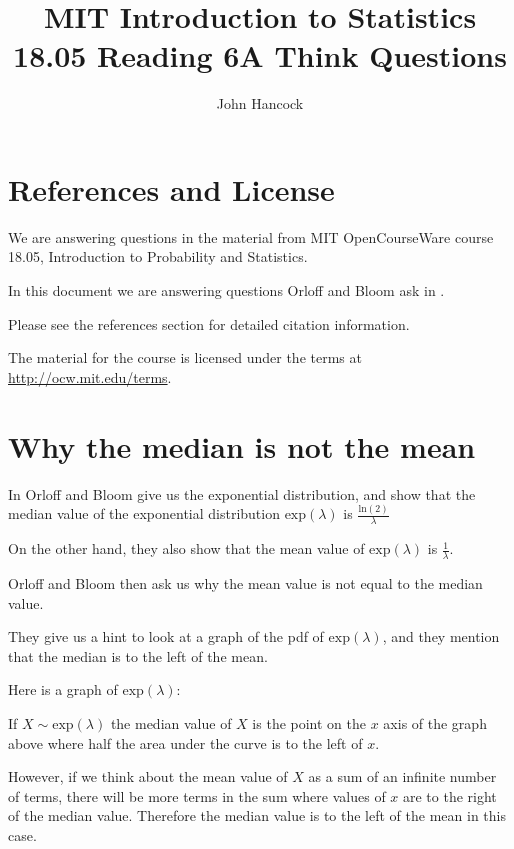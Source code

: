 \documentclass[a4paper,11pt]{article}
\author{John Hancock}
\title{MIT Introduction to Statistics 18.05 Reading 6A Think Questions }
\begin{document}
\maketitle
\tableofcontents
\section{References and License}
We are answering questions in the material from MIT OpenCourseWare
course 18.05, Introduction to Probability and Statistics.

In this document we are answering questions Orloff and Bloom ask in
\cite{reading6a}.

Please see the references section for detailed citation information.

The material for the course is licensed under the terms at
\url{http://ocw.mit.edu/terms}.

\section{Why the median is not the mean}

In \cite{reading6a} Orloff and Bloom give us the exponential distribution,
and show that the median value of the exponential distribution
$\text{exp}\left(\lambda \right)$ is
$\frac{ \text{ln} \left(2 \right)} {\lambda}$

On the other hand, they also show that the mean value of
$\text{exp}\left(\lambda \right)$ is $\frac{1} {\lambda}$.

Orloff and Bloom then ask us why the mean value is not equal to the median
value.

They give us a hint to look at a graph of the pdf of
$\text{exp}\left(\lambda \right)$, and they mention that the median is to
the left of the mean.

Here is a graph of $\text{exp}\left(\lambda \right)$:


If $X \sim \text{exp}\left(\lambda \right)$ the median value of $X$ is the
point on the $x$ axis of the graph above where half the area under the curve
is to the left of $x$.

However, if we think about the mean value of $X$ as a sum of an infinite
number of terms, there will be more terms in the sum where values of $x$
are to the right of the median value.  Therefore the median value is
to the left of the mean in this case.

\printbibliography{}
\end{document}
